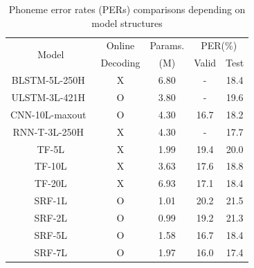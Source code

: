 \documentclass[review]{elsarticle}
\begin{document}
\begin{table}[ht!]
\begin{tabular}{c|ccc|c}
\multirow{2}{*}{Model} & Online   & Params. & \multicolumn{2}{c}{PER(\%)} \\
                       & Decoding & (M)     & Valid & Test \\\hline
BLSTM-5L-250H~\citep{DBLP:conf/icassp/GravesMH13} & X& 6.80 & - & 18.4 \\
ULSTM-3L-421H~\citep{DBLP:conf/icassp/GravesMH13} & O& 3.80 & - & 19.6 \\
CNN-10L-maxout~\citep{DBLP:conf/interspeech/ZhangPBZLBC16} & O & 4.30 & 16.7 & 18.2 \\
RNN-T-3L-250H~\citep{DBLP:conf/icassp/GravesMH13} & X& 4.30 & - & 17.7 \\\hline
TF-5L  & X & 1.99 & 19.4 & 20.0 \\
TF-10L & X & 3.63 & 17.6 & 18.8 \\
TF-20L & X & 6.93 & 17.1 & 18.4 \\\hline
SRF-1L & O & 1.01 & 20.2 & 21.5 \\
SRF-2L & O & 0.99 & 19.2 & 21.3 \\
SRF-5L & O & 1.58 & 16.7 & 18.4 \\
SRF-7L & O & 1.97 & 16.0 & 17.4 \\
\end{tabular}
\caption{Phoneme error rates (PERs) comparisons depending on model structures}
\label{Tab:pc}
\end{table}
\end{document}
